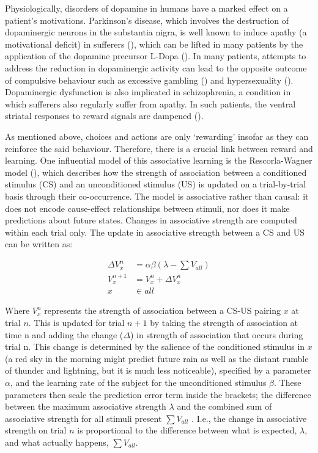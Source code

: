 Physiologically, disorders of dopamine in humans have a marked effect on a patient’s motivations. Parkinson’s disease, which involves the destruction of dopaminergic neurons in the substantia nigra, is well known to induce apathy (a motivational deficit) in sufferers (\cite{denbrokApathyParkinsonsDisease2015}), which can be lifted in many patients by the application of the dopamine precursor L-Dopa (\cite{czerneckiMotivationRewardParkinsons2002}). In many patients, attempts to address the reduction in dopaminergic activity can lead to the opposite outcome of compulsive behaviour such as excessive gambling (\cite{grossetProblematicGamblingDopamine2006}) and hypersexuality (\cite{romitoTransientManiaHypersexuality2002}). Dopaminergic dysfunction is also implicated in schizophrenia, a condition in which sufferers also regularly suffer from apathy. In such patients, the ventral striatal responses to reward signals are dampened (\cite{juckelDysfunctionVentralStriatal2006}).

As mentioned above, choices and actions are only ‘rewarding’ insofar as they can reinforce the said behaviour. Therefore, there is a crucial link between reward and learning. One influential model of this associative learning is the Rescorla-Wagner model (\cite{rescorla1972theory}), which describes how the strength of association between a conditioned stimulus (CS) and an unconditioned stimulus (US) is updated on a trial-by-trial basis through their co-occurrence. The model is associative rather than causal: it does not encode cause-effect relationships between stimuli, nor does it make predictions about future states. Changes in associative strength are computed within each trial only. The update in associative strength between a CS and US can be written as:

\begin{equation}
\begin{aligned}
\Delta V_x^n &= \alpha \beta \left( \lambda - \sum V_{all} \right) \\
V_x^{n+1} &= V_x^n + \Delta V_x^n \\
x &\in all
\end{aligned}
\label{eq:rescorla}
\end{equation}

Where $V_x^n$ represents the strength of association between a CS-US pairing $x$ at trial $n$. This is updated for trial $n+1$ by taking the strength of association at time n and adding the change ($\Delta$) in strength of association that occurs during trial n. This change is determined by the salience of the conditioned stimulus in $x$ (a red sky in the morning might predict future rain as well as the distant rumble of thunder and lightning, but it is much less noticeable), specified by a parameter $\alpha$, and the learning rate of the subject for the unconditioned stimulus $\beta$. These parameters then scale the prediction error term inside the brackets; the difference between the maximum associative strength $\lambda$ and the combined sum of associative strength for all stimuli present $\sum V_{all}$ . I.e., the change in associative strength on trial $n$ is proportional to the difference between what is expected, $\lambda$, and what actually happens, $\sum V_{all}$.

